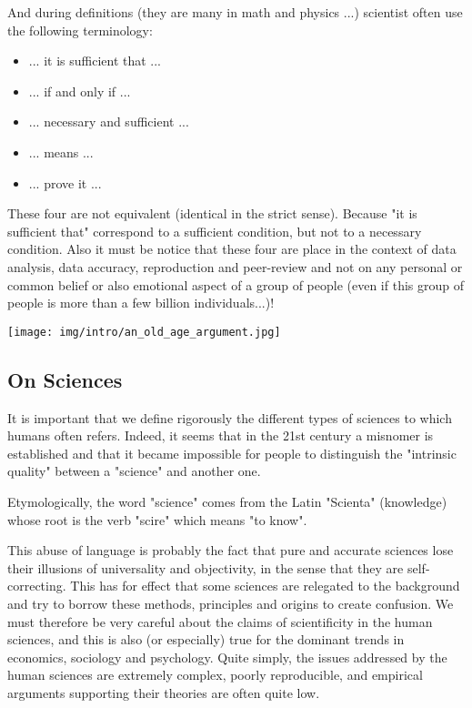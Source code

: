 	And during definitions (they are many in math and physics ...) scientist often use the following terminology:
	
	\begin{itemize}
	\item ... it is sufficient that ...
	
	\item ... if and only if ...
	
	\item ... necessary and sufficient ...
	
	\item ... means ...
	
	\item ... prove it ...
	\end{itemize}
	These four are not equivalent (identical in the strict sense). Because "it is sufficient that" correspond to a sufficient condition, but not to a necessary condition. Also it must be notice that these four are place in the context of data analysis, data accuracy, reproduction and peer-review and not on any personal or common belief or also emotional aspect of a group of people (even if this group of people is more than a few billion individuals...)!
	\begin{center}
		\texttt{[image: img/intro/an\_old\_age\_argument.jpg]}
	\end{center}

	\subsection{On Sciences}	
	It is important that we define rigorously the different types of sciences to which humans often refers. Indeed, it seems that in the 21st century a misnomer is established and that it became impossible for people to distinguish the "intrinsic quality" between a "science" and another one.

	\begin{tcolorbox}[title=Remark,colframe=black,arc=10pt]
Etymologically, the word "science" comes from the Latin "Scienta" (knowledge) whose root is the verb "scire" which means "to know".
	\end{tcolorbox}

This abuse of language is probably the fact that pure and accurate sciences lose their illusions of universality and objectivity, in the sense that they are self-correcting. This has for effect that some sciences are relegated to the background and try to borrow these methods, principles and origins to create confusion. We must therefore be very careful about the claims of scientificity in the human sciences, and this is also (or especially) true for the dominant trends in economics, sociology and psychology. Quite simply, the issues addressed by the human sciences are extremely complex, poorly reproducible, and empirical arguments supporting their theories are often quite low.

